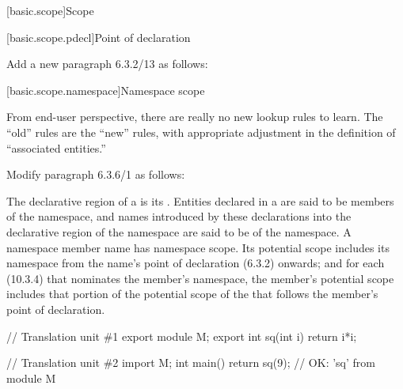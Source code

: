 [basic.scope]{Scope}%

\setcounter{subsection}{1}
[basic.scope.pdecl]{Point of declaration}

\noindent
Add a new paragraph 6.3.2/13 as follows:
\resetalinea[12]
\begin{std.txt}\color{addclr}
\alinea
\end{std.txt}

\setcounter{subsection}{5}
[basic.scope.namespace]{Namespace scope}

From end-user perspective, there are really no new lookup rules to
learn.  The ``old'' rules are the ``new'' rules, with appropriate
adjustment in the definition of ``associated entities.''

\noindent
Modify paragraph 6.3.6/1 as follows:
\begin{std.txt}
  \resetalinea[0]
  \alinea
  The declarative region of a  is its
  . 
  Entities declared in a 
  are said to be members of the namespace, and names introduced by
  these declarations 
  into the declarative region of the namespace are said to be
   of the namespace. A namespace member name
  has namespace
  scope. Its potential scope includes its namespace from the name's
  point of declaration (6.3.2) onwards;
   and for each 
  (10.3.4) that nominates the member's namespace, the member's
  potential scope includes that portion of the potential scope of the
   that follows the member's point of
  declaration. 
  \color{addclr}
   \enterexample
   \begin{codeblock}
    // Translation unit \#1
    export module M;
    export int sq(int i) { return i*i; }

    // Translation unit \#2
    import M;
    int main() { return sq(9); }       // OK: 'sq' from module M
    \end{codeblock}
    \exitexample
\end{std.txt}


